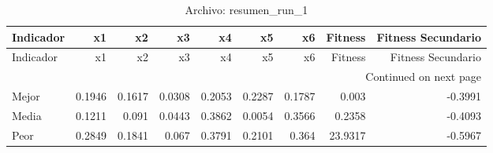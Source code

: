 \begin{longtable}{lrrrrrrrr}
\caption{Archivo: resumen\_run\_1}\label{tab:resumen_run_1} \\
\toprule
Indicador & x1 & x2 & x3 & x4 & x5 & x6 & Fitness & Fitness Secundario \\
\midrule
\endfirsthead
\toprule
Indicador & x1 & x2 & x3 & x4 & x5 & x6 & Fitness & Fitness Secundario \\
\midrule
\endhead
\midrule
\multicolumn{9}{r}{Continued on next page} \\
\midrule
\endfoot
\bottomrule
\endlastfoot
Mejor & 0.1946 & 0.1617 & 0.0308 & 0.2053 & 0.2287 & 0.1787 & 0.003 & -0.3991 \\
Media & 0.1211 & 0.091 & 0.0443 & 0.3862 & 0.0054 & 0.3566 & 0.2358 & -0.4093 \\
Peor & 0.2849 & 0.1841 & 0.067 & 0.3791 & 0.2101 & 0.364 & 23.9317 & -0.5967 \\
\end{longtable}